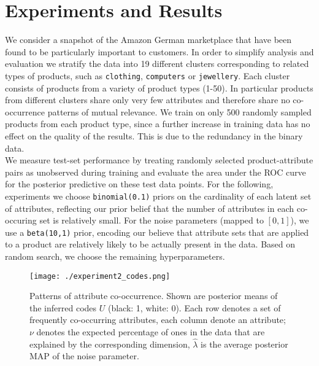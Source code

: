 \documentclass{article}
\begin{document}
\section{Experiments and Results}
We consider a snapshot of the Amazon German marketplace that have been found to be particularly important to customers.
In order to simplify analysis and evaluation we stratify the data into
19 different clusters corresponding to related types of products, such
as \texttt{clothing}, \texttt{computers} or \texttt{jewellery}. Each
cluster consists of products from a variety of product types (1-50). In particular products from different clusters share only very few attributes and therefore share no co-occurrence patterns of mutual relevance. We train on only 500 randomly sampled products from each product type, since a further increase in training data has no effect on the quality of the results. This is due to the redundancy in the binary data.\\
We measure test-set performance by treating randomly selected
product-attribute pairs as unobserved during training and evaluate the area under the ROC curve for the posterior predictive on these test data points.
For the following, experiments we choose \texttt{binomial(0.1)}
priors on the cardinality of each latent set of 
attributes, reflecting our prior belief that the number of
attributes in each co-occuring set is relatively small. For the 
noise parameters (mapped to $[0,1]$), we use a \texttt{beta(10,1)} prior, encoding our believe 
that attribute sets that are applied to a product are relatively
likely to be actually present in the data.
Based on random search, we choose
the remaining hyperparameters.


\begin{figure}[htbp]
\centering
\texttt{[image: ./experiment2\_codes.png]}
\caption{\label{fig:orgca0a434}
Patterns of attribute co-occurrence. Shown are posterior means of the
inferred codes \(U\) (black: 1, white: 0). Each row denotes a set of
frequently co-occurring attributes, each column denote an attribute; $\nu$ denotes the expected
percentage of ones in the data that are explained by the corresponding
dimension, $\hat\lambda$ is the average posterior MAP of the noise parameter.}
\end{figure}
\end{document}

